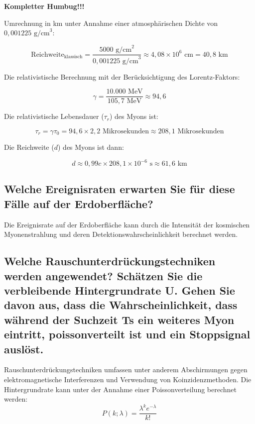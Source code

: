 \documentclass[a4paper,12pt]{article}
\begin{document}
{\textbf{Kompletter Humbug!!!}


Umrechnung in km unter Annahme einer atmosphärischen Dichte von $0,001225 \text{ g/cm}^3$:



\[
\text{Reichweite}_{\text{klassisch}} = \frac{5000 \text{ g/cm}^2}{0,001225 \text{ g/cm}^3} \approx 4,08 \times 10^6 \text{ cm} = 40,8 \text{ km}
\]



Die relativistische Berechnung mit der Berücksichtigung des Lorentz-Faktors:



\[
\gamma = \frac{10.000 \text{ MeV}}{105,7 \text{ MeV}} \approx 94,6
\]



Die relativistische Lebensdauer (\(\tau_r\)) des Myons ist:



\[
\tau_r = \gamma \tau_0 = 94,6 \times 2,2 \text{ Mikrosekunden} \approx 208,1 \text{ Mikrosekunden}
\]



Die Reichweite (\(d\)) des Myons ist dann:



\[
d \approx 0,99c \times 208,1 \times 10^{-6} \text{ s} \approx 61,6 \text{ km}
\]

    

\subsection{Welche Ereignisraten erwarten Sie für diese Fälle auf der Erdoberfläche?}
Die Ereignisrate auf der Erdoberfläche kann durch die Intensität der kosmischen Myonenstrahlung und deren Detektionswahrscheinlichkeit berechnet werden.

\subsection{Welche Rauschunterdrückungstechniken werden angewendet? Schätzen Sie die verbleibende Hintergrundrate U. Gehen Sie davon aus, dass die Wahrscheinlichkeit, dass während der Suchzeit Ts ein weiteres Myon eintritt, poissonverteilt ist und ein Stoppsignal auslöst.}
Rauschunterdrückungstechniken umfassen unter anderem Abschirmungen gegen elektromagnetische Interferenzen und Verwendung von Koinzidenzmethoden. Die Hintergrundrate kann unter der Annahme einer Poissonverteilung berechnet werden:
$$P(k; \lambda) = \frac{\lambda^k e^{-\lambda}}{k!}$$

}
\end{document}
